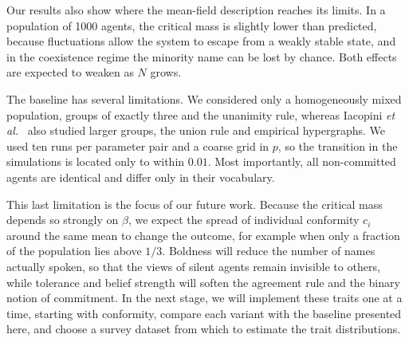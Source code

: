 \documentclass[9pt,twoside]{pnas-new}
\begin{document}
Our results also show where the mean-field description reaches its limits. In a
population of 1000 agents, the critical mass is slightly lower than predicted,
because fluctuations allow the system to escape from a weakly stable state, and
in the coexistence regime the minority name can be lost by chance. Both effects
are expected to weaken as $N$ grows.

The baseline has several limitations. We considered only a homogeneously mixed
population, groups of exactly three and the unanimity rule, whereas Iacopini
\emph{et al.}~\cite{iacopini2022group} also studied larger groups, the union
rule and empirical hypergraphs. We used ten runs per parameter pair and a
coarse grid in $p$, so the transition in the simulations is located only to
within $0.01$. Most importantly, all non-committed agents are identical and
differ only in their vocabulary.

This last limitation is the focus of our future work. Because the critical mass
depends so strongly on $\beta$, we expect the spread of individual conformity
$c_i$ around the same mean to change the outcome, for example when only a
fraction of the population lies above $1/3$. Boldness will reduce the number of
names actually spoken, so that the views of silent agents remain invisible to
others, while tolerance and belief strength will soften the agreement rule and
the binary notion of commitment. In the next stage, we will implement these
traits one at a time, starting with conformity, compare each variant with the
baseline presented here, and choose a survey dataset from which to estimate the
trait distributions.


\showacknow{}


\end{document}
